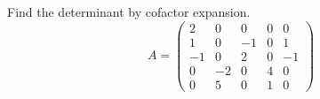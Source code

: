 \documentclass{ximera}
\author{Parisa Fatheddin}
\begin{document}
\begin{exercise}

Find the determinant by cofactor expansion. 
\[
A= \begin{pmatrix}
2 & 0 & 0 & 0 & 0\\
1 & 0 & -1 & 0 & 1\\
-1 & 0 & 2 & 0 & -1 \\
0 & -2 & 0 & 4 & 0\\
0 & 5 & 0 & 1 & 0 
\end{pmatrix}
\]















\end{exercise}
\end{document}
